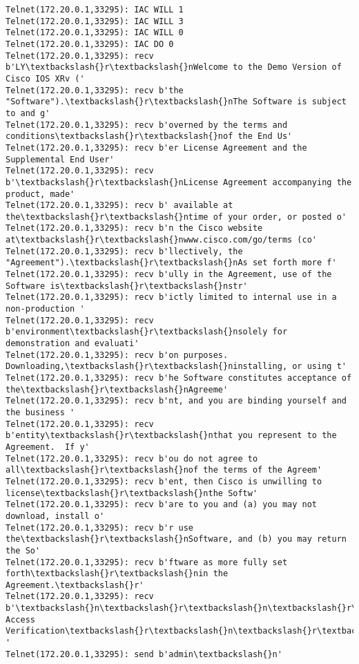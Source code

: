 \documentclass[11pt]{article}
\begin{document}
\begin{Verbatim}[commandchars=\\\{\}]
Telnet(172.20.0.1,33295): IAC WILL 1
Telnet(172.20.0.1,33295): IAC WILL 3
Telnet(172.20.0.1,33295): IAC WILL 0
Telnet(172.20.0.1,33295): IAC DO 0
Telnet(172.20.0.1,33295): recv b'LY\textbackslash{}r\textbackslash{}nWelcome to the Demo Version of Cisco IOS XRv ('
Telnet(172.20.0.1,33295): recv b'the "Software").\textbackslash{}r\textbackslash{}nThe Software is subject to and g'
Telnet(172.20.0.1,33295): recv b'overned by the terms and conditions\textbackslash{}r\textbackslash{}nof the End Us'
Telnet(172.20.0.1,33295): recv b'er License Agreement and the Supplemental End User'
Telnet(172.20.0.1,33295): recv b'\textbackslash{}r\textbackslash{}nLicense Agreement accompanying the product, made'
Telnet(172.20.0.1,33295): recv b' available at the\textbackslash{}r\textbackslash{}ntime of your order, or posted o'
Telnet(172.20.0.1,33295): recv b'n the Cisco website at\textbackslash{}r\textbackslash{}nwww.cisco.com/go/terms (co'
Telnet(172.20.0.1,33295): recv b'llectively, the "Agreement").\textbackslash{}r\textbackslash{}nAs set forth more f'
Telnet(172.20.0.1,33295): recv b'ully in the Agreement, use of the Software is\textbackslash{}r\textbackslash{}nstr'
Telnet(172.20.0.1,33295): recv b'ictly limited to internal use in a non-production '
Telnet(172.20.0.1,33295): recv b'environment\textbackslash{}r\textbackslash{}nsolely for demonstration and evaluati'
Telnet(172.20.0.1,33295): recv b'on purposes.  Downloading,\textbackslash{}r\textbackslash{}ninstalling, or using t'
Telnet(172.20.0.1,33295): recv b'he Software constitutes acceptance of the\textbackslash{}r\textbackslash{}nAgreeme'
Telnet(172.20.0.1,33295): recv b'nt, and you are binding yourself and the business '
Telnet(172.20.0.1,33295): recv b'entity\textbackslash{}r\textbackslash{}nthat you represent to the Agreement.  If y'
Telnet(172.20.0.1,33295): recv b'ou do not agree to all\textbackslash{}r\textbackslash{}nof the terms of the Agreem'
Telnet(172.20.0.1,33295): recv b'ent, then Cisco is unwilling to license\textbackslash{}r\textbackslash{}nthe Softw'
Telnet(172.20.0.1,33295): recv b'are to you and (a) you may not download, install o'
Telnet(172.20.0.1,33295): recv b'r use the\textbackslash{}r\textbackslash{}nSoftware, and (b) you may return the So'
Telnet(172.20.0.1,33295): recv b'ftware as more fully set forth\textbackslash{}r\textbackslash{}nin the Agreement.\textbackslash{}r'
Telnet(172.20.0.1,33295): recv b'\textbackslash{}n\textbackslash{}r\textbackslash{}n\textbackslash{}r\textbackslash{}nUser Access Verification\textbackslash{}r\textbackslash{}n\textbackslash{}r\textbackslash{}nUsername: '
Telnet(172.20.0.1,33295): send b'admin\textbackslash{}n'

\end{Verbatim}
\end{document}
